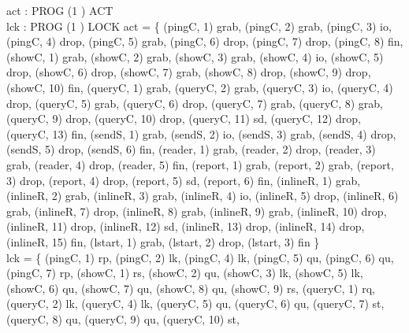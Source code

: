 \documentclass[a4paper,10pt,fleqn]{article}
\begin{document}
\begin{axdef}
  act : PROG \cross (1 ) \pfun ACT \\
  lck : PROG \cross (1 ) \pfun LOCK
\where
  act = \{ (pingC, 1) \mapsto grab, (pingC, 2) \mapsto grab, (pingC, 3) \mapsto io,
    (pingC, 4) \mapsto drop, (pingC, 5) \mapsto grab, (pingC, 6) \mapsto drop,
    (pingC, 7) \mapsto drop, (pingC, 8) \mapsto fin,
    (showC, 1) \mapsto grab, (showC, 2) \mapsto grab, (showC, 3) \mapsto grab,
    (showC, 4) \mapsto io, (showC, 5) \mapsto drop, (showC, 6) \mapsto drop,
    (showC, 7) \mapsto grab, (showC, 8) \mapsto drop, (showC, 9) \mapsto drop,
    (showC, 10) \mapsto fin,
    (queryC, 1) \mapsto grab, (queryC, 2) \mapsto grab, (queryC, 3) \mapsto io,
    (queryC, 4) \mapsto drop, (queryC, 5) \mapsto grab, (queryC, 6) \mapsto drop,
    (queryC, 7) \mapsto grab, (queryC, 8) \mapsto grab, (queryC, 9) \mapsto drop,
    (queryC, 10) \mapsto drop, (queryC, 11) \mapsto sd, (queryC, 12) \mapsto drop,
    (queryC, 13) \mapsto fin,
    (sendS, 1) \mapsto grab, (sendS, 2) \mapsto io, (sendS, 3) \mapsto grab,
    (sendS, 4) \mapsto drop, (sendS, 5) \mapsto drop, (sendS, 6) \mapsto fin,
    (reader, 1) \mapsto grab, (reader, 2) \mapsto drop, (reader, 3) \mapsto grab,
    (reader, 4) \mapsto drop, (reader, 5) \mapsto fin,
    (report, 1) \mapsto grab, (report, 2) \mapsto grab, (report, 3) \mapsto drop,
    (report, 4) \mapsto drop, (report, 5) \mapsto sd, (report, 6) \mapsto fin,
    (inlineR, 1) \mapsto grab, (inlineR, 2) \mapsto grab, (inlineR, 3) \mapsto grab,
    (inlineR, 4) \mapsto io, (inlineR, 5) \mapsto drop, (inlineR, 6) \mapsto grab,
    (inlineR, 7) \mapsto drop, (inlineR, 8) \mapsto grab, (inlineR, 9) \mapsto grab,
    (inlineR, 10) \mapsto drop, (inlineR, 11) \mapsto drop, (inlineR, 12) \mapsto sd,
    (inlineR, 13) \mapsto drop, (inlineR, 14) \mapsto drop, (inlineR, 15) \mapsto fin,
    (lstart, 1) \mapsto grab, (lstart, 2) \mapsto drop, (lstart, 3) \mapsto fin \} \\
  lck = \{ (pingC, 1) \mapsto rp, (pingC, 2) \mapsto lk, (pingC, 4) \mapsto lk,
    (pingC, 5) \mapsto qu, (pingC, 6) \mapsto qu, (pingC, 7) \mapsto rp,
    (showC, 1) \mapsto rs, (showC, 2) \mapsto qu, (showC, 3) \mapsto lk,
    (showC, 5) \mapsto lk, (showC, 6) \mapsto qu, (showC, 7) \mapsto qu,
    (showC, 8) \mapsto qu, (showC, 9) \mapsto rs,
    (queryC, 1) \mapsto rq, (queryC, 2) \mapsto lk, (queryC, 4) \mapsto lk,
    (queryC, 5) \mapsto qu, (queryC, 6) \mapsto qu, (queryC, 7) \mapsto st,
    (queryC, 8) \mapsto qu, (queryC, 9) \mapsto qu, (queryC, 10) \mapsto st,

\end{axdef}
\end{document}
